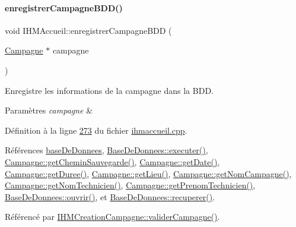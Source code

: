\paragraph{\texorpdfstring{enregistrer\+Campagne\+B\+D\+D()}{enregistrerCampagneBDD()}}
{\footnotesize\ttfamily void I\+H\+M\+Accueil\+::enregistrer\+Campagne\+B\+DD (\begin{DoxyParamCaption}\item[{\hyperlink{class_campagne}{Campagne} $\ast$}]{campagne }\end{DoxyParamCaption})}



Enregistre les informations de la campagne dans la B\+DD. 


\begin{DoxyParams}{Paramètres}
{\em campagne} & \\
\hline
\end{DoxyParams}


Définition à la ligne \hyperlink{ihmaccueil_8cpp_source_l00273}{273} du fichier \hyperlink{ihmaccueil_8cpp_source}{ihmaccueil.\+cpp}.



Références \hyperlink{ihmaccueil_8h_source_l00040}{base\+De\+Donnees}, \hyperlink{basededonnees_8cpp_source_l00104}{Base\+De\+Donnees\+::executer()}, \hyperlink{campagne_8cpp_source_l00055}{Campagne\+::get\+Chemin\+Sauvegarde()}, \hyperlink{campagne_8cpp_source_l00039}{Campagne\+::get\+Date()}, \hyperlink{campagne_8cpp_source_l00044}{Campagne\+::get\+Duree()}, \hyperlink{campagne_8cpp_source_l00034}{Campagne\+::get\+Lieu()}, \hyperlink{campagne_8cpp_source_l00019}{Campagne\+::get\+Nom\+Campagne()}, \hyperlink{campagne_8cpp_source_l00024}{Campagne\+::get\+Nom\+Technicien()}, \hyperlink{campagne_8cpp_source_l00029}{Campagne\+::get\+Prenom\+Technicien()}, \hyperlink{basededonnees_8cpp_source_l00063}{Base\+De\+Donnees\+::ouvrir()}, et \hyperlink{basededonnees_8cpp_source_l00139}{Base\+De\+Donnees\+::recuperer()}.



Référencé par \hyperlink{ihmcreationcampagne_8cpp_source_l00071}{I\+H\+M\+Creation\+Campagne\+::valider\+Campagne()}.


